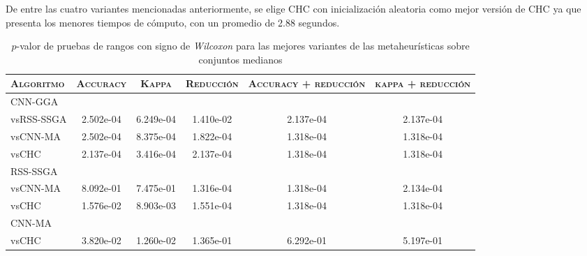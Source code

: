 De entre las cuatro variantes mencionadas anteriormente, se elige CHC con inicialización aleatoria como mejor versión de CHC ya que presenta los menores tiempos de cómputo, con un promedio de 2.88 segundos.

\begin{table}[h!]
\centering
\begin{adjustbox}{max width =\textwidth}
\begin{tabular}{l c c c c c}
\hline
	\textsc{Algoritmo}
	& \multicolumn{1}{c}{\textsc{Accuracy}}
	& \multicolumn{1}{c}{\textsc{Kappa}}
	& \multicolumn{1}{c}{\textsc{Reducción}} 
	& \multicolumn{1}{c}{\textsc{Accuracy + reducción}} 
	& \multicolumn{1}{c}{\textsc{kappa + reducción}} \\

\hline
\hline

CNN-GGA\\
vsRSS-SSGA & 2.502e-04 & 6.249e-04 & 1.410e-02 & 2.137e-04 & 2.137e-04 \\ 
vsCNN-MA   & 2.502e-04 & 8.375e-04 & 1.822e-04 & 1.318e-04 & 1.318e-04 \\
vsCHC      & 2.137e-04 & 3.416e-04 & 2.137e-04 & 1.318e-04 & 1.318e-04 \\

\hline

RSS-SSGA\\
vsCNN-MA & 8.092e-01 & 7.475e-01 & 1.316e-04 & 1.318e-04 & 2.134e-04 \\
vsCHC    & 1.576e-02 & 8.903e-03 & 1.551e-04 & 1.318e-04 & 1.318e-04 \\

\hline

CNN-MA\\
vsCHC & 3.820e-02 & 1.260e-02 & 1.365e-01 & 6.292e-01 & 5.197e-01 \\

\hline

\end{tabular}
\end{adjustbox}
\caption[Pruebas de \emph{Wilcoxon} entre las mejores variaciones de cada metaheurística para conjuntos medianos]{$p$-valor de pruebas de rangos con signo de \emph{Wilcoxon} para las mejores variantes de las metaheurísticas sobre conjuntos medianos}
\label{wilcox-best-med}
\end{table}

